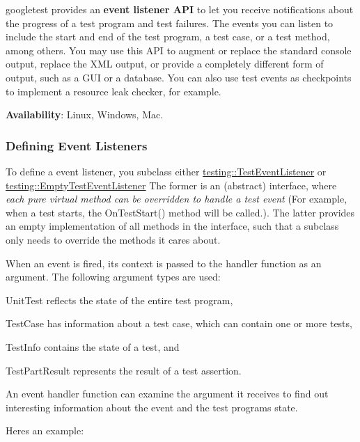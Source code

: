 googletest provides an {\bfseries event listener A\+PI} to let you receive notifications about the progress of a test program and test failures. The events you can listen to include the start and end of the test program, a test case, or a test method, among others. You may use this A\+PI to augment or replace the standard console output, replace the X\+ML output, or provide a completely different form of output, such as a G\+UI or a database. You can also use test events as checkpoints to implement a resource leak checker, for example.

{\bfseries Availability}\+: Linux, Windows, Mac.

\subsubsection*{Defining Event Listeners}

To define a event listener, you subclass either \hyperlink{classtesting_1_1TestEventListener}{testing\+::\+Test\+Event\+Listener} or \hyperlink{classtesting_1_1EmptyTestEventListener}{testing\+::\+Empty\+Test\+Event\+Listener} The former is an (abstract) interface, where {\itshape each pure virtual method can be overridden to handle a test event} (For example, when a test starts, the {\ttfamily On\+Test\+Start()} method will be called.). The latter provides an empty implementation of all methods in the interface, such that a subclass only needs to override the methods it cares about.

When an event is fired, its context is passed to the handler function as an argument. The following argument types are used\+:


\begin{DoxyItemize}
\item Unit\+Test reflects the state of the entire test program,
\item Test\+Case has information about a test case, which can contain one or more tests,
\item Test\+Info contains the state of a test, and
\item Test\+Part\+Result represents the result of a test assertion.
\end{DoxyItemize}

An event handler function can examine the argument it receives to find out interesting information about the event and the test program\textquotesingle{}s state.

Here\textquotesingle{}s an example\+:


